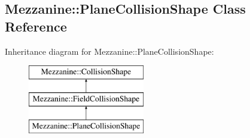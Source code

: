 \hypertarget{classMezzanine_1_1PlaneCollisionShape}{
\subsection{Mezzanine::PlaneCollisionShape Class Reference}
\label{classMezzanine_1_1PlaneCollisionShape}
}
Inheritance diagram for Mezzanine::PlaneCollisionShape:\begin{figure}[H]
\begin{center}
\leavevmode
\includegraphics[height=3.000000cm]{classMezzanine_1_1PlaneCollisionShape}
\end{center}
\end{figure}
